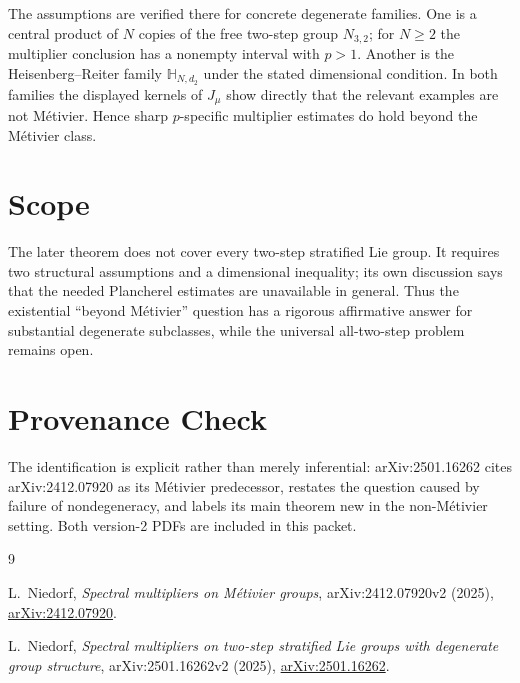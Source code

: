 \documentclass[11pt]{article}
\begin{document}
The assumptions are verified there for concrete degenerate families.  One is
a central product of $N$ copies of the free two-step group $N_{3,2}$; for
$N\ge2$ the multiplier conclusion has a nonempty interval with $p>1$.
Another is the Heisenberg--Reiter family $\mathbb H_{N,d_2}$ under the stated
dimensional condition.  In both families the displayed kernels of $J_\mu$
show directly that the relevant examples are not M\'etivier.  Hence sharp
$p$-specific multiplier estimates do hold beyond the M\'etivier class.

\section*{Scope}

The later theorem does not cover every two-step stratified Lie group.  It
requires two structural assumptions and a dimensional inequality; its own
discussion says that the needed Plancherel estimates are unavailable in
general.  Thus the existential ``beyond M\'etivier'' question has a rigorous
affirmative answer for substantial degenerate subclasses, while the universal
all-two-step problem remains open.

\section*{Provenance Check}

The identification is explicit rather than merely inferential:
arXiv:2501.16262 cites arXiv:2412.07920 as its M\'etivier predecessor, restates
the question caused by failure of nondegeneracy, and labels its main theorem
new in the non-M\'etivier setting.  Both version-2 PDFs are included in this
packet.

\begin{thebibliography}{9}

L.~Niedorf,
\emph{Spectral multipliers on M\'etivier groups},
arXiv:2412.07920v2 (2025),
\href{https://arxiv.org/abs/2412.07920}{arXiv:2412.07920}.

L.~Niedorf,
\emph{Spectral multipliers on two-step stratified Lie groups with degenerate
group structure},
arXiv:2501.16262v2 (2025),
\href{https://arxiv.org/abs/2501.16262}{arXiv:2501.16262}.

\end{thebibliography}
\end{document}
